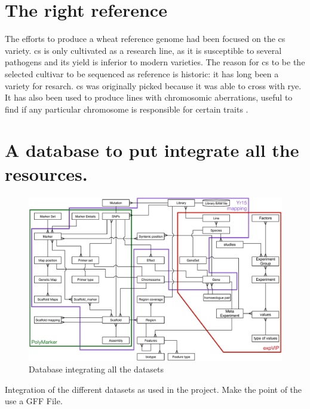 \section{The right reference}

The efforts to produce a wheat reference genome had been focused on the \gls{cs} variety. 
\acrshort{cs} is only cultivated as a research line, as it is susceptible to several pathogens and its yield is inferior to modern varieties.  
The reason for \acrshort{cs} to be the selected cultivar to be sequenced as reference is historic: it has long been a variety  for resarch.
\acrshort{cs} was originally picked because it was able to cross with rye. 
It has also been used to produce lines with chromosomic aberrations, useful to find if any particular chromosome is responsible for certain traits \citep{Sears1985}. 




\section{A database to put integrate all the resources. }

\begin{figure}
\includegraphics[width=1\textwidth]{Conclusions/Figures/CompleteDatabase.pdf}
\caption{Database integrating all the datasets}
\end{figure}
Integration of the different datasets as used in the project. 
Make the point of the use a GFF File. 


